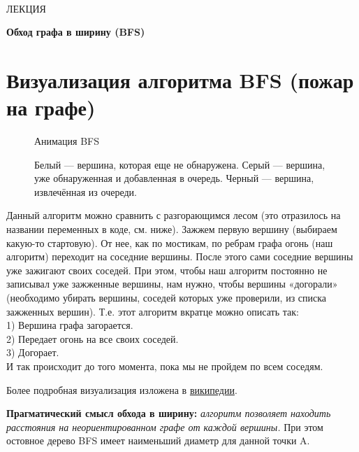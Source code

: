\documentclass[a4paper,12pt]{article}
\theoremstyle{plain} %
\theoremstyle{definition} %
\theoremstyle{remark} %
\begin{document}
\newcommand{\lec}[1]{\addtocounter{lec}{1} \setcounter{section}{0}%
\begin{center}
{\LARGE ЛЕКЦИЯ %
\vspace{2mm}%

\textbf{#1}%
}
\end{center}
}
\newpage
\
\setcounter{lec}{18}
\lec{Обход графа в ширину (BFS)}
\section{Визуализация алгоритма BFS (пожар на графе)}
\begin{wrapfigure}{r}{0.4\linewidth}
\begin{frame}{Анимация BFS}
\end{frame}
\caption{Белый — вершина, которая еще не обнаружена. Серый — вершина, уже обнаруженная и добавленная в очередь. Черный — вершина, извлечённая из очереди.}
\vspace{-0.7cm}
\end{wrapfigure}

Данный алгоритм можно сравнить с разгорающимся лесом (это отразилось на названии переменных в коде, см. ниже). Зажжем первую вершину (выбираем какую-то стартовую). От нее, как по мостикам, по ребрам графа огонь (наш алгоритм) переходит на соседние вершины. После этого сами соседние вершины уже зажигают своих соседей. При этом, чтобы наш алгоритм постоянно не записывал уже зажженные вершины, нам нужно, чтобы вершины «догорали» (необходимо убирать вершины, соседей которых уже проверили, из списка зажженных вершин). Т.е. этот алгоритм вкратце можно описать так:\\
1) Вершина графа загорается.\\
2) Передает огонь на все своих соседей.\\
3) Догорает.\\
И так происходит до того момента, пока мы не пройдем по всем соседям.


Более подробная визуализация изложена в \href{https://ru.wikipedia.org/wiki/%D0%9F%D0%BE%D0%B8%D1%81%D0%BA_%D0%B2_%D1%88%D0%B8%D1%80%D0%B8%D0%BD%D1%83}{википедии}.

\textbf{Прагматический смысл обхода в ширину:} \textit{алгоритм позволяет находить расстояния на неориентированном графе от каждой вершины.}  При этом остовное дерево BFS имеет наименьший диаметр для данной точки A.
\end{document}
